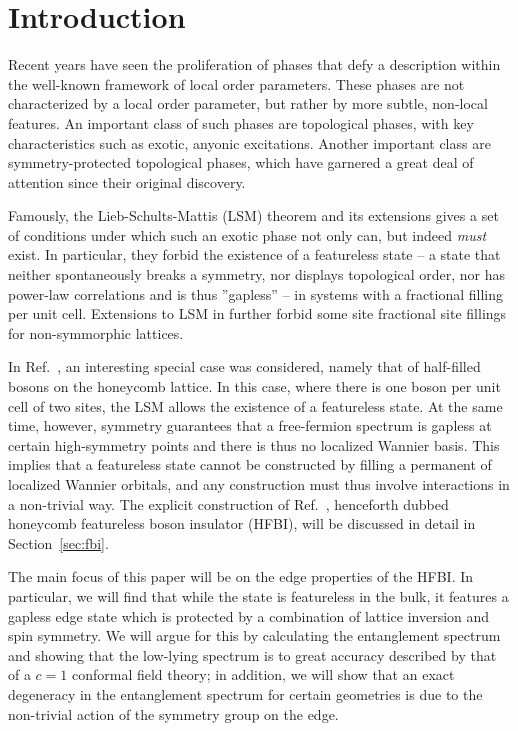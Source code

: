 
\section{Introduction}


Recent years have seen the proliferation of phases that defy a description
within the well-known framework of local order parameters. These phases are
not characterized by a local order parameter, but rather by more subtle,
non-local features. An important class of such phases are topological phases,
with key characteristics such as exotic, anyonic excitations. Another
important class are symmetry-protected topological phases, which have
garnered a great deal of attention since their original discovery.

Famously, the Lieb-Schults-Mattis (LSM) theorem and its extensions gives a set of
conditions under which such an exotic phase not only can, but indeed \emph{must}
exist. In particular, they forbid the existence of a featureless state
-- a state that neither spontaneously breaks a symmetry, nor displays topological
order, nor has power-law correlations and is thus ''gapless'' -- in systems
with a fractional filling per unit cell. Extensions to LSM in  further
forbid some site fractional site fillings for non-symmorphic lattices.

In Ref.~, an interesting special case was considered,
namely that of half-filled bosons on the honeycomb lattice. In this case, where
there is one boson per unit cell of two sites, the LSM allows the existence
of a featureless state. At the same time, however, symmetry guarantees that
a free-fermion spectrum is gapless at certain high-symmetry points and there is
thus no localized Wannier basis. This implies that
a featureless state cannot be constructed by filling a permanent
of localized Wannier orbitals, and any construction must thus involve interactions
in a non-trivial way. The explicit construction of Ref.~,
henceforth dubbed honeycomb featureless boson insulator (HFBI),
will be discussed in detail in Section~\ref{sec:fbi}.

The main focus of this paper will be on the edge properties of the HFBI.
In particular, we will find that while the state is featureless in the bulk, it
features a gapless edge state which is protected by a combination of lattice inversion
and spin symmetry. We will argue for this by calculating the entanglement spectrum
and showing
that the low-lying spectrum is to great accuracy described by that of a $c=1$
conformal field theory; in addition, we will show that an exact degeneracy
in the entanglement spectrum for certain geometries is due to the non-trivial
action of the symmetry group on the edge.

